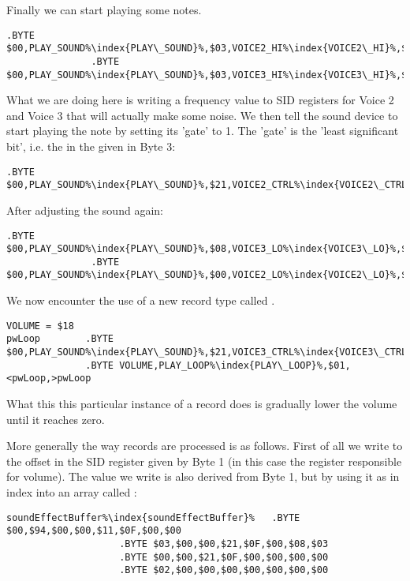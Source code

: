 Finally we can start playing some notes.
\begin{lstlisting}[escapechar=\%]
               .BYTE $00,PLAY_SOUND%\index{PLAY\_SOUND}%,$03,VOICE2_HI%\index{VOICE2\_HI}%,$00
               .BYTE $00,PLAY_SOUND%\index{PLAY\_SOUND}%,$03,VOICE3_HI%\index{VOICE3\_HI}%,$00
\end{lstlisting}

What we are doing here is writing a frequency value to SID registers for Voice 2 and Voice 3 that will actually make some noise.
We then tell the sound device to start playing the note by setting its 'gate' to 1. The 'gate' is the 'least significant bit', i.e.
the  in the  given in Byte 3:

\begin{lstlisting}[escapechar=\%]
               .BYTE $00,PLAY_SOUND%\index{PLAY\_SOUND}%,$21,VOICE2_CTRL%\index{VOICE2\_CTRL}%,$00
\end{lstlisting}

After adjusting the sound again:


\begin{lstlisting}[escapechar=\%]
               .BYTE $00,PLAY_SOUND%\index{PLAY\_SOUND}%,$08,VOICE3_LO%\index{VOICE3\_LO}%,$00
               .BYTE $00,PLAY_SOUND%\index{PLAY\_SOUND}%,$00,VOICE2_LO%\index{VOICE2\_LO}%,$00
\end{lstlisting}

We now encounter the use of a new record type called . 

\begin{lstlisting}[escapechar=\%]
VOLUME = $18
pwLoop        .BYTE $00,PLAY_SOUND%\index{PLAY\_SOUND}%,$21,VOICE3_CTRL%\index{VOICE3\_CTRL}%,$01
              .BYTE VOLUME,PLAY_LOOP%\index{PLAY\_LOOP}%,$01,<pwLoop,>pwLoop
\end{lstlisting}

What this this particular instance of a  record does is gradually lower the volume until it reaches zero.

More generally the way  records are processed is as follows. First of all we write to the offset in the SID register 
given by Byte 1 (in this case the register responsible for volume). The value we write is also derived from Byte 1, but by using it
as in index into an array called :

\begin{lstlisting}[escapechar=\%]
soundEffectBuffer%\index{soundEffectBuffer}%   .BYTE $00,$94,$00,$00,$11,$0F,$00,$00
                    .BYTE $03,$00,$00,$21,$0F,$00,$08,$03
                    .BYTE $00,$00,$21,$0F,$00,$00,$00,$00
                    .BYTE $02,$00,$00,$00,$00,$00,$00,$00
\end{lstlisting}


